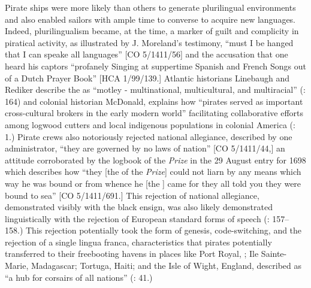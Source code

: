 Pirate ships were more likely than others to generate plurilingual environments and also enabled sailors with ample time to converse to acquire new languages. Indeed, plurilingualism became, at the time, a marker of guilt and complicity in piratical activity, as illustrated by J. Moreland’s testimony, “must I be hanged that I can speake all languages” [CO 5/1411/56] and the accusation that one  heard his captors “profanely Singing at suppertime Spanish and French Songs out of a Dutch Prayer Book” [HCA 1/99/139.] Atlantic historians Linebaugh and Rediker describe the  as “motley - multinational, multicultural, and multiracial” (\citeyear*{LinebaughRediker2000}: 164) and colonial historian McDonald, explains how “pirates served as important cross-cultural brokers in the early modern world” facilitating collaborative efforts among logwood cutters and local indigenous populations in colonial America (\citeyear*{McDonald2016}: 1.)  Pirate crews also notoriously rejected national allegiance, described by one administrator, “they are governed by no laws of nation” [CO 5/1411/44,] an attitude corroborated by the logbook of the \textit{ Prize} in the 29 August entry for 1698 which describes how “they [the  of the \textit{ Prize}] could not liarn by any means which way he was bound or from whence he [the ] came for they all told you they were bound to sea” [CO 5/1411/691.] This rejection of national allegiance, demonstrated visibly with the black ensign, was also likely demonstrated linguistically with the rejection of European standard forms of speech (\citealt{Delgado2013}: 157--158.) This rejection potentially took the form of  genesis, code-switching, and the rejection of a single lingua franca, characteristics that pirates potentially transferred to their freebooting havens in places like Port Royal, ; Ile Sainte-Marie, Madagascar; Tortuga, Haiti; and the Isle of Wight, England, described as “a hub for corsairs of all nations” (\citealt{Bicheno2012}: 41.) 

